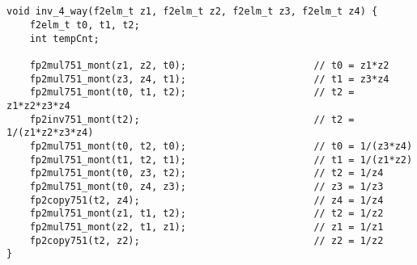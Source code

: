 \subsection{}

\begin{lstlisting}[basicstyle=\tiny]
void inv_4_way(f2elm_t z1, f2elm_t z2, f2elm_t z3, f2elm_t z4) {
  	f2elm_t t0, t1, t2;
	int tempCnt;

    fp2mul751_mont(z1, z2, t0);                      // t0 = z1*z2
    fp2mul751_mont(z3, z4, t1);                      // t1 = z3*z4
    fp2mul751_mont(t0, t1, t2);                      // t2 = z1*z2*z3*z4
    fp2inv751_mont(t2);                              // t2 = 1/(z1*z2*z3*z4)
    fp2mul751_mont(t0, t2, t0);                      // t0 = 1/(z3*z4)
    fp2mul751_mont(t1, t2, t1);                      // t1 = 1/(z1*z2)
    fp2mul751_mont(t0, z3, t2);                      // t2 = 1/z4
    fp2mul751_mont(t0, z4, z3);                      // z3 = 1/z3
    fp2copy751(t2, z4);                              // z4 = 1/z4
    fp2mul751_mont(z1, t1, t2);                      // t2 = 1/z2
    fp2mul751_mont(z2, t1, z1);                      // z1 = 1/z1
    fp2copy751(t2, z2);                              // z2 = 1/z2
}
\end{lstlisting}

\subsection{}

